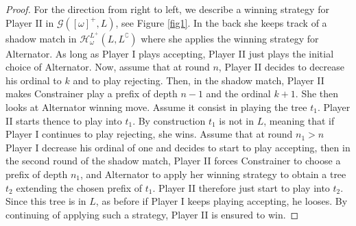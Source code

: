 \begin{proof}
For the direction from right to left, we describe a winning strategy for Player II in $\mathcal{G}([\omega]^+, L)$, see Figure \ref{fig1}. In the back she keeps track of a shadow match in $\mathcal{H}^{L^+}_\omega(L, L^\complement)$ where she applies the  winning strategy for Alternator. 
As long as Player I plays accepting, Player II just plays the initial choice of Alternator. Now, assume that at round $n$, Player II decides to decrease his ordinal to $k$ and to play rejecting. Then, in the shadow match, Player II makes Constrainer play a prefix of depth $n-1$ and the ordinal $k+1$. She then looks at Alternator winning move. Assume it consist in playing the tree $t_1$. Player II starts thence to play into $t_1$. By construction $t_1$ is not in $L$, meaning that if Player I continues to play rejecting, she wins. Assume that at round $n_1> n$ Player I decrease his ordinal of one and decides to start to play accepting, then in the second round of the shadow match, Player II forces Constrainer to choose a prefix of depth $n_1$, and Alternator to apply her winning strategy to obtain a tree $t_2$ extending the chosen prefix of $t_1$. Player II therefore just start to play into $t_2$. Since this tree is in $L$, as before if Player I keeps playing accepting, he looses. By continuing of applying such a strategy, Player II is ensured to win. 
\end{proof}


